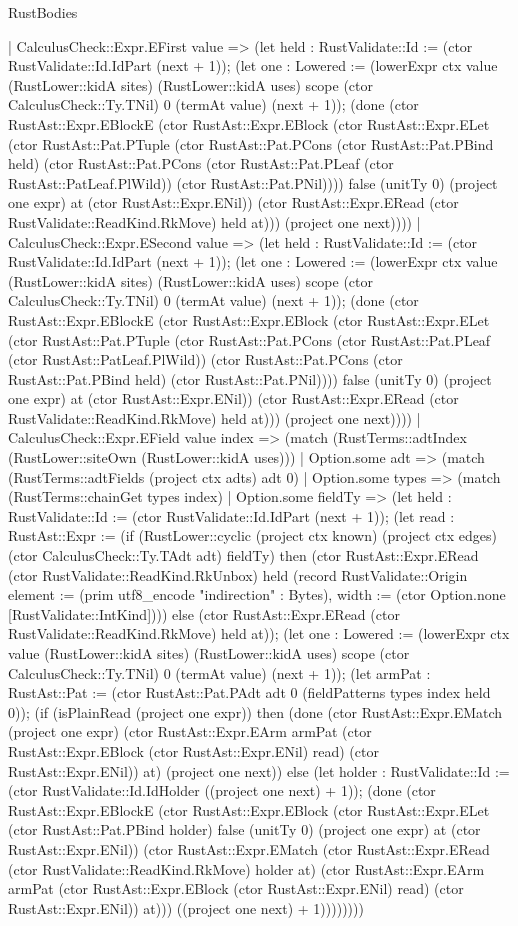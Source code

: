 \begin{lexlean}{RustBodies}
\begin{semanticmodule}
{    | CalculusCheck::Expr.EFirst value => (let held : RustValidate::Id := (ctor RustValidate::Id.IdPart (next + 1)); (let one : Lowered := (lowerExpr ctx value (RustLower::kidA sites) (RustLower::kidA uses) scope (ctor CalculusCheck::Ty.TNil) 0 (termAt value) (next + 1)); (done (ctor RustAst::Expr.EBlockE (ctor RustAst::Expr.EBlock (ctor RustAst::Expr.ELet (ctor RustAst::Pat.PTuple (ctor RustAst::Pat.PCons (ctor RustAst::Pat.PBind held) (ctor RustAst::Pat.PCons (ctor RustAst::Pat.PLeaf (ctor RustAst::PatLeaf.PlWild)) (ctor RustAst::Pat.PNil)))) false (unitTy 0) (project one expr) at (ctor RustAst::Expr.ENil)) (ctor RustAst::Expr.ERead (ctor RustValidate::ReadKind.RkMove) held at))) (project one next))))
    | CalculusCheck::Expr.ESecond value => (let held : RustValidate::Id := (ctor RustValidate::Id.IdPart (next + 1)); (let one : Lowered := (lowerExpr ctx value (RustLower::kidA sites) (RustLower::kidA uses) scope (ctor CalculusCheck::Ty.TNil) 0 (termAt value) (next + 1)); (done (ctor RustAst::Expr.EBlockE (ctor RustAst::Expr.EBlock (ctor RustAst::Expr.ELet (ctor RustAst::Pat.PTuple (ctor RustAst::Pat.PCons (ctor RustAst::Pat.PLeaf (ctor RustAst::PatLeaf.PlWild)) (ctor RustAst::Pat.PCons (ctor RustAst::Pat.PBind held) (ctor RustAst::Pat.PNil)))) false (unitTy 0) (project one expr) at (ctor RustAst::Expr.ENil)) (ctor RustAst::Expr.ERead (ctor RustValidate::ReadKind.RkMove) held at))) (project one next))))
    | CalculusCheck::Expr.EField value index => (match (RustTerms::adtIndex (RustLower::siteOwn (RustLower::kidA uses)))
      | Option.some adt => (match (RustTerms::adtFields (project ctx adts) adt 0)
        | Option.some types => (match (RustTerms::chainGet types index)
          | Option.some fieldTy => (let held : RustValidate::Id := (ctor RustValidate::Id.IdPart (next + 1)); (let read : RustAst::Expr := (if (RustLower::cyclic (project ctx known) (project ctx edges) (ctor CalculusCheck::Ty.TAdt adt) fieldTy) then (ctor RustAst::Expr.ERead (ctor RustValidate::ReadKind.RkUnbox) held (record RustValidate::Origin {element := (prim utf8_encode "indirection" : Bytes), width := (ctor Option.none [RustValidate::IntKind])})) else (ctor RustAst::Expr.ERead (ctor RustValidate::ReadKind.RkMove) held at)); (let one : Lowered := (lowerExpr ctx value (RustLower::kidA sites) (RustLower::kidA uses) scope (ctor CalculusCheck::Ty.TNil) 0 (termAt value) (next + 1)); (let armPat : RustAst::Pat := (ctor RustAst::Pat.PAdt adt 0 (fieldPatterns types index held 0)); (if (isPlainRead (project one expr)) then (done (ctor RustAst::Expr.EMatch (project one expr) (ctor RustAst::Expr.EArm armPat (ctor RustAst::Expr.EBlock (ctor RustAst::Expr.ENil) read) (ctor RustAst::Expr.ENil)) at) (project one next)) else (let holder : RustValidate::Id := (ctor RustValidate::Id.IdHolder ((project one next) + 1)); (done (ctor RustAst::Expr.EBlockE (ctor RustAst::Expr.EBlock (ctor RustAst::Expr.ELet (ctor RustAst::Pat.PBind holder) false (unitTy 0) (project one expr) at (ctor RustAst::Expr.ENil)) (ctor RustAst::Expr.EMatch (ctor RustAst::Expr.ERead (ctor RustValidate::ReadKind.RkMove) holder at) (ctor RustAst::Expr.EArm armPat (ctor RustAst::Expr.EBlock (ctor RustAst::Expr.ENil) read) (ctor RustAst::Expr.ENil)) at))) ((project one next) + 1))))))))
}
\end{semanticmodule}
\end{lexlean}
